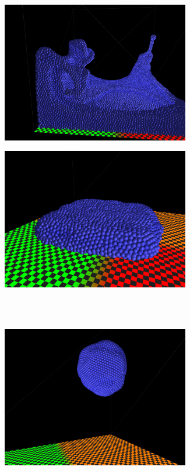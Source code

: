 \begin{figure}[H]
\centering
\begin{subfigure}{.5\textwidth}
  \centering
  \includegraphics[width=0.9\textwidth]{img/eVorticity100.png}
  \caption{}
\end{subfigure}%
\begin{subfigure}{.5\textwidth}
  \centering
  \includegraphics[width=0.9\textwidth]{img/cViscosity001.png}
  \caption{}
\end{subfigure}%
\\ \\
\centering
\begin{subfigure}{.5\textwidth}
  \centering
  \includegraphics[width=0.9\textwidth]{img/gravity0.png}

\end{subfigure}
\end{figure}
